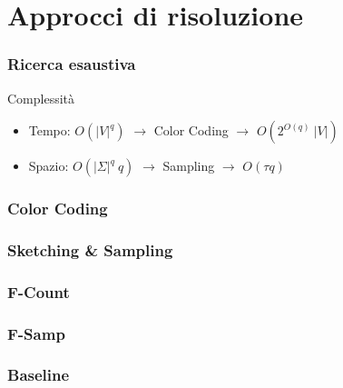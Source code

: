 \section{Approcci di risoluzione}

\begin{frame}
	\sectionpage
	\centering
\end{frame}

\begin{frame}
	\frametitle{Ricerca esaustiva}

	Complessità
	\begin{itemize}
		\item Tempo: $O(|V|^q)$ $\rightarrow$ Color Coding $\rightarrow$ $O(2^{O(q)}\ |V|)$
		\item Spazio: $O(|\Sigma|^q\ q)$ $\rightarrow$ Sampling $\rightarrow$ $O(\tau q)$
	\end{itemize}
\end{frame}

\begin{frame}
	\frametitle{Color Coding}
	\centering
\end{frame}

\begin{frame}
	\frametitle{Sketching \& Sampling}
	\centering
\end{frame}

\begin{frame}
	\frametitle{F-Count}
	\centering
\end{frame}

\begin{frame}
	\frametitle{F-Samp}
	\centering
\end{frame}

\begin{frame}
	\frametitle{Baseline}
	\centering
\end{frame}
